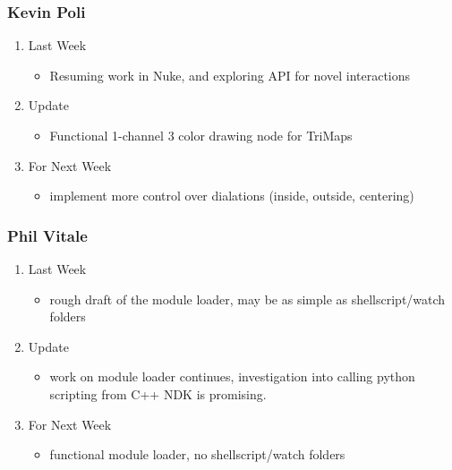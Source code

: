 \documentclass[15pt]{article}
\begin{document}
\subsubsection{Kevin Poli}
\label{sec:org25f3f9a}
\begin{enumerate}
\item Last Week
\label{sec:org3e92556}
\begin{itemize}
\item Resuming work in Nuke, and exploring API for novel interactions
\end{itemize}
\item Update
\label{sec:org9450e9e}
\begin{itemize}
\item Functional 1-channel 3 color drawing node for TriMaps
\end{itemize}
\item For Next Week
\label{sec:org8f0ba34}
\begin{itemize}
\item implement more control over dialations (inside, outside, centering)
\end{itemize}
\end{enumerate}
\subsubsection{Phil Vitale}
\label{sec:org0bece8b}
\begin{enumerate}
\item Last Week
\label{sec:org6286cf2}
\begin{itemize}
\item rough draft of the module loader, may be as simple as shellscript/watch folders
\end{itemize}

\item Update
\label{sec:orgd2dea7e}
\begin{itemize}
\item work on module loader continues, investigation into calling python scripting
from C++ NDK is promising.
\end{itemize}
\item For Next Week
\label{sec:org842bf87}
\begin{itemize}
\item functional module loader, no shellscript/watch folders
\end{itemize}
\end{enumerate}
\end{document}
